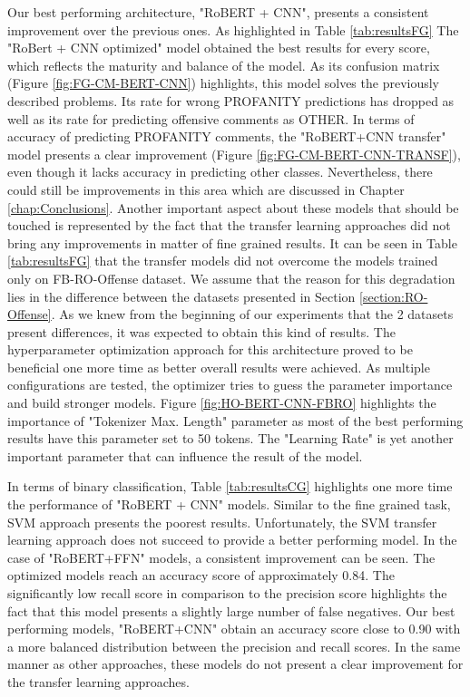 \documentclass[12pt,a4paper]{report}
\begin{document}
Our best performing architecture, "RoBERT + CNN", presents a consistent improvement over the previous ones. As highlighted in Table \ref{tab:resultsFG} The "RoBert + CNN optimized" model obtained the best results for every score, which reflects the maturity and balance of the model. As its confusion matrix (Figure \ref{fig:FG-CM-BERT-CNN})  highlights, this model solves the previously described problems. Its rate for wrong PROFANITY predictions has dropped as well as its rate for predicting offensive comments as OTHER. In terms of accuracy of predicting PROFANITY comments, the "RoBERT+CNN transfer" model presents a clear improvement (Figure \ref{fig:FG-CM-BERT-CNN-TRANSF}), even though it lacks accuracy in predicting other classes. Nevertheless, there could still be improvements in this area which are discussed in Chapter \ref{chap:Conclusions}. Another important aspect about these models that should be touched is represented by the fact that the transfer learning approaches did not bring any improvements in matter of fine grained results. It can be seen in Table \ref{tab:resultsFG} that the transfer models did not overcome the models trained only on FB-RO-Offense dataset. We assume that the reason for this degradation lies in the difference between the datasets presented in Section \ref{section:RO-Offense}. As we knew from the beginning of our experiments that the 2 datasets present differences, it was expected to obtain this kind of results. 
The hyperparameter optimization approach for this architecture proved to be beneficial one more time as better overall results were achieved. As multiple configurations are tested, the optimizer tries to guess the parameter importance and build stronger models. Figure \ref{fig:HO-BERT-CNN-FBRO} highlights the importance of "Tokenizer Max. Length" parameter as most of the best performing results have this parameter set to 50 tokens. The "Learning Rate" is yet another important parameter that can influence the result of the model. 

In terms of binary classification, Table \ref{tab:resultsCG} highlights one more time the performance of "RoBERT + CNN" models. Similar to the fine grained task, SVM approach presents the poorest results. Unfortunately, the SVM transfer learning approach does not succeed to provide a better performing model. In the case of "RoBERT+FFN" models, a consistent improvement can be seen. The optimized models reach an accuracy score of approximately 0.84. The significantly low recall score in comparison to the precision score highlights the fact that this model presents a slightly large number of false negatives. Our best performing models, "RoBERT+CNN" obtain an accuracy score close to 0.90 with a more balanced distribution between the precision and recall scores. In the same manner as other approaches, these models do not present a clear improvement for the transfer learning approaches.
\end{document}
